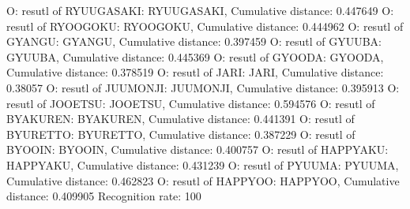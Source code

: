O: resutl of RYUUGASAKI: RYUUGASAKI, Cumulative distance: 0.447649
O: resutl of RYOOGOKU: RYOOGOKU, Cumulative distance: 0.444962
O: resutl of GYANGU: GYANGU, Cumulative distance: 0.397459
O: resutl of GYUUBA: GYUUBA, Cumulative distance: 0.445369
O: resutl of GYOODA: GYOODA, Cumulative distance: 0.378519
O: resutl of JARI: JARI, Cumulative distance: 0.38057
O: resutl of JUUMONJI: JUUMONJI, Cumulative distance: 0.395913
O: resutl of JOOETSU: JOOETSU, Cumulative distance: 0.594576
O: resutl of BYAKUREN: BYAKUREN, Cumulative distance: 0.441391
O: resutl of BYURETTO: BYURETTO, Cumulative distance: 0.387229
O: resutl of BYOOIN: BYOOIN, Cumulative distance: 0.400757
O: resutl of HAPPYAKU: HAPPYAKU, Cumulative distance: 0.431239
O: resutl of PYUUMA: PYUUMA, Cumulative distance: 0.462823
O: resutl of HAPPYOO: HAPPYOO, Cumulative distance: 0.409905
Recognition rate: 100%

